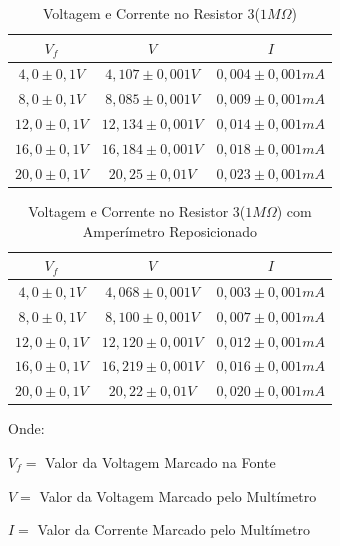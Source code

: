 \documentclass[article]{abntex2}
\begin{document}
\begin{table}[htb]
\begin{center}
\caption{Voltagem e Corrente no Resistor 3($1M\Omega$)}
\begin{tabular}{ |c|c|c| }
        \hline
        $V_f$ &$V$ &$I$ \\
        \hline
        $4,0 \pm 0,1V$ &$4,107 \pm 0,001V$ &$0,004 \pm 0,001mA$ \\
        \hline
        $8,0 \pm 0,1V$ &$8,085 \pm 0,001V$ &$0,009 \pm 0,001mA$ \\
        \hline
        $12,0 \pm 0,1V$ &$12,134 \pm 0,001V$ &$0,014 \pm 0,001mA$ \\
        \hline
        $16,0 \pm 0,1V$ &$16,184 \pm 0,001V$ &$0,018 \pm 0,001mA$ \\
        \hline
        $20,0 \pm 0,1V$ &$20,25 \pm 0,01V$ &$0,023 \pm 0,001mA$ \\
        \hline
\end{tabular}
\end{center}
\end{table}
\begin{table}[htb]
\begin{center}
\caption{Voltagem e Corrente no Resistor 3($1M\Omega$) com Amperímetro Reposicionado}
\begin{tabular}{ |c|c|c| }
            \hline
            $V_f$ &$V$ &$I$ \\
            \hline
            $4,0 \pm 0,1V$ &$4,068 \pm 0,001V$ &$0,003 \pm 0,001mA$ \\
            \hline
            $8,0 \pm 0,1V$ &$8,100 \pm 0,001V$ &$0,007 \pm 0,001mA$ \\
            \hline
            $12,0 \pm 0,1V$ &$12,120 \pm 0,001V$ &$0,012 \pm 0,001mA$ \\
            \hline
            $16,0 \pm 0,1V$ &$16,219 \pm 0,001V$ &$0,016 \pm 0,001mA$ \\
            \hline
            $20,0 \pm 0,1V$ &$20,22 \pm 0,01V$ &$0,020 \pm 0,001mA$ \\
            \hline
\end{tabular}
\end{center}
\end{table}
\newpage
Onde:
\newline

$V_f =$ Valor da Voltagem Marcado na Fonte

$V =$ Valor da Voltagem Marcado pelo Multímetro

$I =$ Valor da Corrente Marcado pelo Multímetro
\newline   
\end{document}
